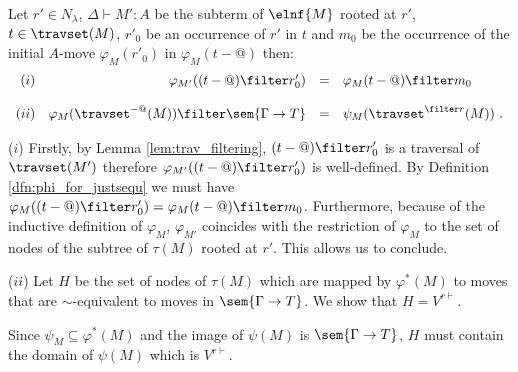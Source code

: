 \begin{lemma}
\label{lem:varphi_filter}
Let $r'\in N_\lambda$, $\Delta \vdash M' : A$ be the subterm of $\elnf{M}$ rooted at $r'$, $t\in\travset(M)$, $r'_0$ be an occurrence of $r'$ in $t$
and $m_0$ be the occurrence of the initial $A$-move $\varphi_M(r'_0)$ in $\varphi_M(t-@)$ then:
$$\begin{array}{rrcl}
(i)& \varphi_{M'}((t-@)\filter r'_0) &=& \varphi_M(t-@) \filter m_0 \\ \\
(ii) & \varphi_M(\travset^{-@}(M)) \filter \sem{\Gamma \rightarrow T} &=& \psi_M(\travset^{\filter r}(M))\ .
\end{array}
$$
\end{lemma}
\proof 
($i$) Firstly, by Lemma \ref{lem:trav_filtering}, $(t-@)\filter r'_0$ is a traversal of $\travset(M')$ therefore
$\varphi_{M'}((t-@)\filter r'_0)$ is well-defined. By Definition \ref{dfn:phi_for_justsequ} we must have
$\varphi_{M}((t-@)\filter r'_0) = \varphi_M(t-@) \filter m_0$. Furthermore, because of 
the inductive definition of $\varphi_{M}$, $\varphi_{M'}$ coincides with the restriction of $\varphi_{M}$ to the set of nodes of the subtree of $\tau(M)$ rooted at $r'$. This allows us to conclude.


($ii$) Let $H$ be the set of nodes of $\tau(M)$ which are mapped by 
$\varphi^*(M)$ to moves that are $\sim$-equivalent to moves in $\sem{\Gamma \rightarrow T}$.
We show that $H = V^{r\vdash}$.

Since $\psi_M \subseteq \varphi^*(M)$ and the image of $\psi(M)$ is $\sem{\Gamma \rightarrow T}$, $H$ must contain the domain of $\psi(M)$ which is $V^{r\vdash}$.

